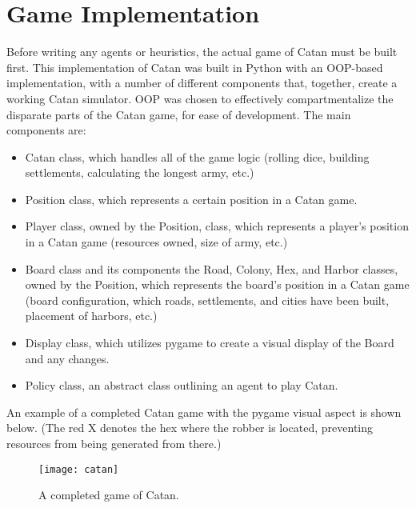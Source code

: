 \documentclass[a4paper, 11pt]{article}
\begin{document}
\section{Game Implementation}
Before writing any agents or heuristics, the actual game of Catan must be built first. This implementation of Catan was built in Python with an OOP-based implementation, with a number of different components that, together, create a working Catan simulator. OOP was chosen to effectively compartmentalize the disparate parts of the Catan game, for ease of development. The main components are:
\begin{itemize}
	\item Catan class, which handles all of the game logic (rolling dice, building settlements, calculating the longest army, etc.)
	\item Position class, which represents a certain position in a Catan game.
	\item Player class, owned by the Position, class, which represents a player's position in a Catan game (resources owned, size of army, etc.)
	\item Board class and its components the Road, Colony, Hex, and Harbor classes, owned by the Position, which represents the board's position in a Catan game (board configuration, which roads, settlements, and cities have been built, placement of harbors, etc.)
	\item Display class, which utilizes pygame to create a visual display of the Board and any changes.
	\item Policy class, an abstract class outlining an agent to play Catan.
\end{itemize}

\noindent An example of a completed Catan game with the pygame visual aspect is shown below. (The red X denotes the hex where the robber is located, preventing resources from being generated from there.)

\clearpage

\begin{figure}
  \caption{A completed game of Catan.}
  \begin{center}
    \texttt{[image: catan]}
  \end{center}
\end{figure}
\end{document}
